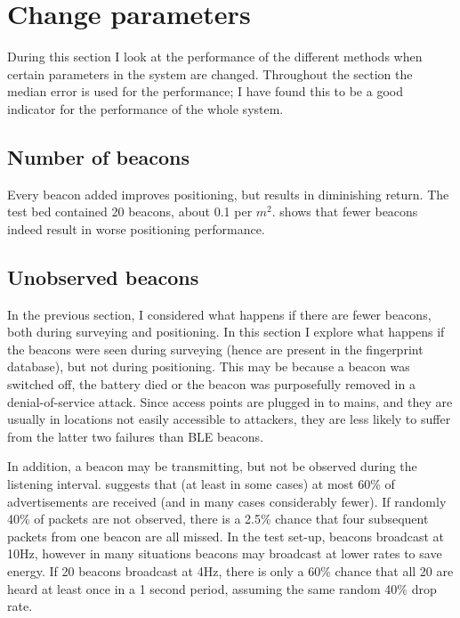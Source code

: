 \section{Change parameters}
During this section I look at the performance of the different methods when certain parameters in the system are changed.
Throughout the section the median error is used for the performance; I have found this to be a good indicator for the performance of the whole system.

\subsection{Number of beacons}
Every beacon added improves positioning, but results in diminishing return.
The test bed contained 20 beacons, about 0.1 per $m^2$.
 shows that fewer beacons indeed result in worse positioning performance.


\subsection{Unobserved beacons}
\label{sec:architecture-dying-beacons}
In the previous section, I considered what happens if there are fewer beacons, both during surveying and positioning.
In this section I explore what happens if the beacons were seen during surveying (hence are present in the fingerprint database), but not during positioning.
This may be because a beacon was switched off, the battery died or the beacon was purposefully removed in a denial-of-service attack.
Since \wifi access points are plugged in to mains, and they are usually in locations not easily accessible to attackers, they are less likely to suffer from the latter two failures than BLE beacons.

In addition, a beacon may be transmitting, but not be observed during the listening interval.
 suggests that (at least in some cases) at most 60\% of advertisements are received (and in many cases considerably fewer).
If randomly 40\% of packets are not observed, there is a 2.5\% chance that four subsequent packets from one beacon are all missed.
In the test set-up, beacons broadcast at 10Hz, however in many situations beacons may broadcast at lower rates to save energy.
If 20 beacons broadcast at 4Hz, there is only a 60\% chance that all 20 are heard at least once in a 1 second period, assuming the same random 40\% drop rate.

